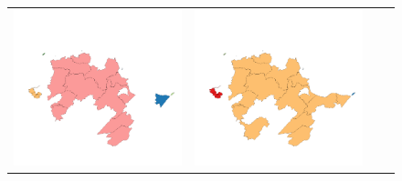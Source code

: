 \begin{figure}
\begin{tabularx}{1\textwidth}{XXXX}
\includegraphics[width=1\linewidth]{images/ch6/contig/11}&
\includegraphics[width=1\linewidth]{images/ch6/contig/12} \\

\end{tabularx}
\end{figure}
